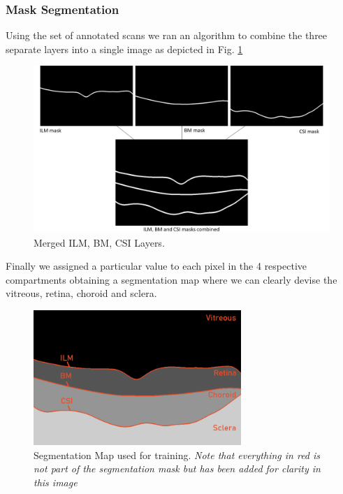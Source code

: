 \documentclass[12pt,a4paper]{scrartcl}
\begin{document}
\subsubsection{Mask Segmentation}
Using the set of annotated scans we ran an algorithm to combine the three separate layers into a single image as depicted in Fig. \ref{fig:merged}

\begin{figure}[H]
    \centering
    \includegraphics[width=1\textwidth]{./images/ILM_BM_CSI_merged.png}
    \caption{Merged ILM, BM, CSI Layers.}
    \label{fig:merged}
\end{figure}

Finally we assigned a particular value to each pixel in the 4 respective compartments obtaining a segmentation map where we can clearly devise the vitreous, retina, choroid and sclera.

\begin{figure}[H]
    \centering
    \includegraphics[width=0.7\textwidth]{./images/chun_w00_fix_14_segmented_annotated.png}
    \caption{Segmentation Map used for training. \emph{Note that everything in red is not part of the segmentation mask but has been added for clarity in this image}}
    \label{fig:annotated-layers}
\end{figure}
\end{document}
